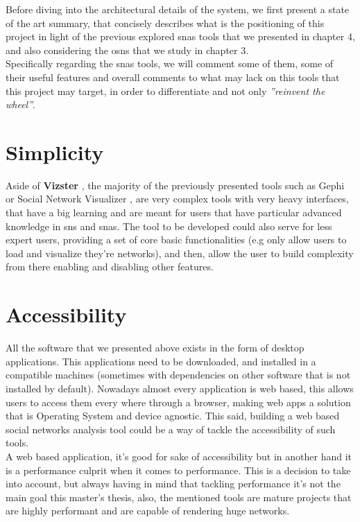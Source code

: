 Before diving into the architectural details of the system, we first present a state of the art summary, that concisely describes what is the positioning of this project in light of the previous explored \glspl{sna} tools that we presented in chapter 4, and also considering the \glspl{osn} that we study in chapter 3.\\
\indent Specifically regarding the \glspl{sna} tools, we will comment some of them, some of their useful features and overall comments to what may lack on this tools that this project may target, in order to differentiate and not only \textit{''reinvent the wheel''}.

\section{Simplicity}
Aside of \textbf{Vizster} \citep{heer2005vizster}, the majority of the previously presented tools such as Gephi \citep{bastian2009gephi} or Social Network Visualizer \citep{socnetv}, are very complex tools with very heavy interfaces, that have a big learning and are meant for users that have particular advanced knowledge in \glspl{sn} and \glspl{sna}. The tool to be developed could also serve for less expert users, providing a set of core basic functionalities (e.g only allow users to load and visualize they're networks), and then, allow the user to build complexity from there enabling and disabling other features.

\section{Accessibility}
All the software that we presented above exists in the form of desktop applications. This applications need to be downloaded, and installed in a compatible machines (sometimes with dependencies on other software that is not installed by default). Nowadays almost every application is web based, this allows users to access them every where through a browser, making web apps a solution that is Operating System and device agnostic. This said, building a web based social networks analysis tool could be a way of tackle the accessibility of such tools.\\
\indent A web based application, it's good for sake of accessibility but in another hand it is a performance culprit when it comes to performance. This is a decision to take into account, but always having in mind that tackling performance it's not the main goal this master's thesis, also, the mentioned tools are mature projects that are highly performant and are capable of rendering huge networks.

